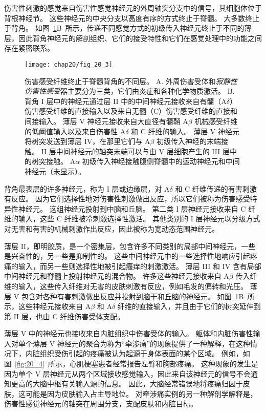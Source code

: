 伤害性刺激的感觉来自伤害性感觉神经元的外周轴突分支中的信号，其细胞体位于背根神经节。
这些神经元的中央分支以高度有序的方式终止于脊髓。
大多数终止于背角。
如图~\ref{fig:20_3}B~所示，传递不同感觉方式的初级传入神经元终止于不同的薄层，因此背角神经元的解剖组织、它们的接受特性和它们在感觉处理中的功能之间存在紧密联系。


\begin{figure}[htbp]
	\centering
	\texttt{[image: chap20/fig\_20\_3]}
	\caption{伤害感受纤维终止于脊髓背角的不同层。
		A. 外周伤害受体和\textit{寂静性伤害性感受}器主要分为三类，它们由炎症和各种化学物质激活。
		B. 背角 I 层中的神经元通过层 II 中的中间神经元接收来自有髓（A$ \delta $）伤害感受纤维的直接输入以及来自无髓（C）伤害感受纤维的直接和间接输入。
		薄层 V 神经元接收来自大直径有髓鞘 A$ \beta $ 机械感受纤维的低阈值输入以及来自伤害性 A$ \delta $ 和 C 纤维的输入。
		薄层 V 神经元将树突发送到薄层 IV，在那里它们与 A$ \beta $ 初级传入神经的末端接触。
		II 层中间神经元的轴突末端可以与由 V 层细胞产生的 III 层中的树突接触。
		A$ \alpha $ 初级传入神经接触腹侧脊髓中的运动神经元和中间神经元（未显示）\cite{fields1987painful}。}
	\label{fig:20_3}
\end{figure}


背角最表层的许多神经元，称为 I 层或边缘层，对 A$ \delta $ 和 C 纤维传递的有害刺激有反应。
因为它们选择性地对伤害性刺激做出反应，所以它们被称为伤害感受特异性神经元。
这组神经元投射到中脑和丘脑。
第二类 I 层神经元接收来自 C 纤维的输入，这些 C 纤维被冷刺激选择性激活。
其他类别的 I 层神经元以分级方式对无害和有害的机械刺激作出反应，因此被称为宽动态范围神经元。


薄层 II，即明胶质，是一个密集层，包含许多不同类别的局部中间神经元，一些是兴奋性的，另一些是抑制性的。
这些中间神经元中的一些选择性地响应引起疼痛的输入，而另一些则选择性地被引起瘙痒的刺激激活。
薄层 III 和 IV 含有局部中间神经元和脊髓上投射神经元的混合物。
许多这些神经元接收来自 A$ \beta $ 传入纤维的输入，这些传入纤维对无害的皮肤刺激有反应，例如毛发的偏转和光压。
薄层 V 包含对各种有害刺激做出反应并投射到脑干和丘脑的神经元。
如图~\ref{fig:20_3}B~所示，这些神经元接收来自 A$ \beta $ 和 A$\delta$ 纤维的直接输入，并且由于它们的树突延伸到第 II 层，也由 C 纤维伤害受体支配。


薄层 V 中的神经元也接收来自内脏组织中伤害受体的输入。
躯体和内脏伤害性输入对单个薄层 V 神经元的聚合为称为“牵涉痛”的现象提供了一种解释，在这种情况下，内脏组织受伤引起的疼痛被认为起源于身体表面的某个区域。 
例如，如图~\ref{fig:20_4}~所示，心肌梗塞患者经常报告左臂和胸部疼痛。
这种现象的发生是因为单个 V 层神经元从两个区域接收感觉输入，因此来自该神经元的信号不会通知更高的大脑中枢有关输入源的信息。
因此，大脑经常错误地将疼痛归因于皮肤，这可能是因为皮肤输入占主导地位。
对牵涉痛实例的另一种解剖学解释是，伤害性感觉神经元的轴突在周围分支，支配皮肤和内脏目标。


